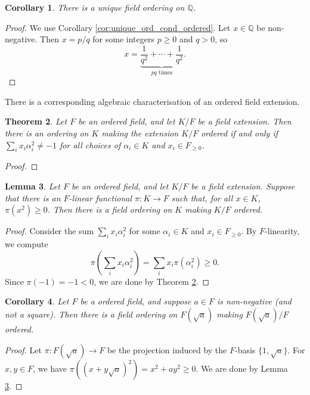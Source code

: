 \documentclass[a4paper]{report}
\newtheorem{theorem}{Theorem}
\newtheorem{lemma}[theorem]{Lemma}
\newtheorem{corollary}[theorem]{Corollary}
\theoremstyle{definition}
\newcommand\Q{\mathbb{Q}}
\begin{document}
\begin{corollary}
  \label{cor:unique_ord_Q}
  There is a unique field ordering on $\Q$.
\end{corollary}
\begin{proof}
  We use Corollary \ref{cor:unique_ord_cond_ordered}. Let $x\in\Q$ be non-negative. Then $x=p/q$ for some integers $p\geq0$ and $q>0$, so 
  \[x=\underbrace{\frac{1}{q^2}+\cdots+\frac{1}{q^2}}_{pq\text{ times}}.\]
\end{proof}

There is a corresponding algebraic characterisation of an ordered field extension.

\begin{theorem}
  \label{thm:ext_ord_cond}
  \leanok
  Let $F$ be an ordered field, and let $K/F$ be a field extension. Then there is an ordering on $K$ making the extension $K/F$ ordered if and only if $\sum_i x_i\alpha_i^2\neq-1$ for all choices of $\alpha_i\in K$ and $x_i\in F_{\geq0}$.
\end{theorem}
\begin{proof}
  \leanok
\end{proof}

\begin{lemma}
  \label{lem:ext_ord_functional_suff}
  Let $F$ be an ordered field, and let $K/F$ be a field extension. Suppose that there is an $F$-linear functional $\pi:K\to F$ such that, for all $x\in K$, $\pi(x^2)\geq0$. Then there is a field ordering on $K$ making $K/F$ ordered.
\end{lemma}
\begin{proof}
  Consider the sum $\sum_i x_i\alpha_i^2$ for some $\alpha_i\in K$ and $x_i\in F_{\geq0}$. By $F$-linearity, we compute
  \[\pi\left(\sum_i x_i\alpha_i^2\right)=\sum_i x_i\pi(\alpha_i^2)\geq0.\]
  Since $\pi(-1)=-1<0$, we are done by Theorem \ref{thm:ext_ord_cond}.
\end{proof}

\begin{corollary}
  \label{cor:ext_ord_to_adj_sqrt}
  Let $F$ be a ordered field, and suppose $a\in F$ is non-negative (and not a square). Then there is a field ordering on $F(\sqrt{a})$ making $F(\sqrt{a})/F$ ordered.
\end{corollary}
\begin{proof}
  Let $\pi:F(\sqrt{a})\to F$ be the projection induced by the $F$-basis $\{1,\sqrt{a}\}$. For $x,y\in F$, we have $\pi((x+y\sqrt{a})^2)=x^2+ay^2\geq0$. We are done by Lemma \ref{lem:ext_ord_functional_suff}.
\end{proof}
\end{document}
